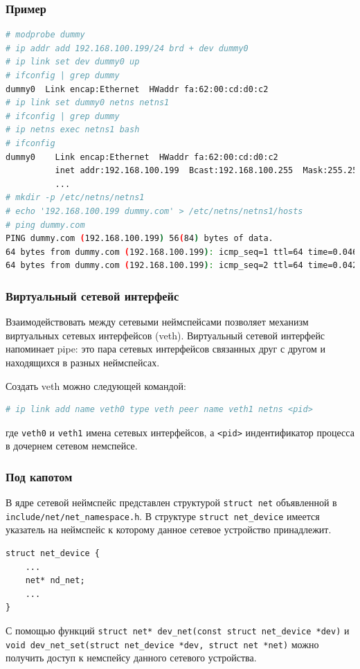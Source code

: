 \begin{frame}[fragile, label={ns_net_example}]
\frametitle{Пример}
\begin{block}{}
\begin{lstlisting}[language=bash, basicstyle={\fontsize{6}{6}\ttfamily}]
# modprobe dummy 
# ip addr add 192.168.100.199/24 brd + dev dummy0 
# ip link set dev dummy0 up 
# ifconfig | grep dummy
dummy0  Link encap:Ethernet  HWaddr fa:62:00:cd:d0:c2
# ip link set dummy0 netns netns1 
# ifconfig | grep dummy
# ip netns exec netns1 bash
# ifconfig
dummy0    Link encap:Ethernet  HWaddr fa:62:00:cd:d0:c2  
          inet addr:192.168.100.199  Bcast:192.168.100.255  Mask:255.255.255.0
          ...
# mkdir -p /etc/netns/netns1
# echo '192.168.100.199 dummy.com' > /etc/netns/netns1/hosts
# ping dummy.com
PING dummy.com (192.168.100.199) 56(84) bytes of data.
64 bytes from dummy.com (192.168.100.199): icmp_seq=1 ttl=64 time=0.046 ms
64 bytes from dummy.com (192.168.100.199): icmp_seq=2 ttl=64 time=0.042 ms
\end{lstlisting}
\end{block}
\end{frame}

\begin{frame}[fragile, label={ns_net_veth}]
\frametitle{Виртуальный сетевой интерфейс}
\begin{block}{}
     Взаимодействовать между сетевыми неймспейсами позволяет механизм \alert{виртуальных сетевых интерфейсов (veth)}. Виртуальный сетевой интерфейс напоминает pipe: это пара сетевых интерфейсов связанных друг с другом и находящихся в разных неймспейсах. 

    Создать veth можно следующей командой:
    \begin{lstlisting}[language=bash, basicstyle={\fontsize{8}{8}\ttfamily}]
# ip link add name veth0 type veth peer name veth1 netns <pid>
\end{lstlisting}
    где \texttt{veth0} и \texttt{veth1} \textemdash{} имена сетевых интерфейсов, а \texttt{<pid>} \textemdash{} индентификатор процесса в дочернем сетевом немспейсе.
\end{block}
\end{frame}

\begin{frame}[fragile, label={ns_net_under_hood}]
\frametitle{Под капотом}
    \begin{block}{}
    В ядре сетевой неймспейс представлен структурой \texttt{struct net} объявленной в \texttt{include/net/net\_namespace.h}. В структуре \texttt{struct net\_device} имеется указатель на неймспейс к которому данное сетевое устройство принадлежит.
\begin{lstlisting}[title=\href{http://lxr.free-electrons.com/source/include/linux/netdevice.h}{netdevice.h}]
struct net_device {
    ...
    net* nd_net;
    ...
}
\end{lstlisting}
    С помощью функций \texttt{struct net* dev\_net(const struct net\_device *dev)} и \texttt{void dev\_net\_set(struct net\_device *dev, struct net *net)} можно получить доступ к немспейсу данного сетевого устройства.
\end{block}
\end{frame}


